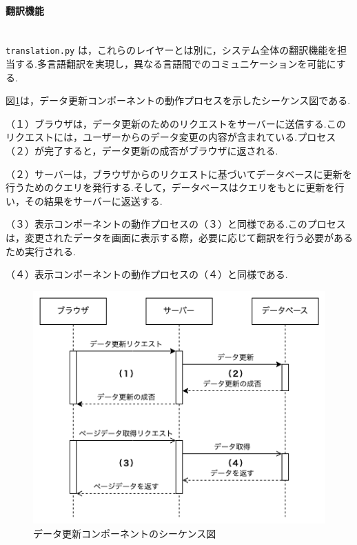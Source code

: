 \documentclass[b5paper,12pt,dvipdfmx]{jsreport}
\begin{document}
\paragraph{翻訳機能}\mbox{}\\
\texttt{translation.py} は，これらのレイヤーとは別に，システム全体の翻訳機能を担当する.多言語翻訳を実現し，異なる言語間でのコミュニケーションを可能にする.

\newpage

図\ref{data_update_component_sequence_diagram}は，データ更新コンポーネントの動作プロセスを示したシーケンス図である.

（１）ブラウザは，データ更新のためのリクエストをサーバーに送信する.このリクエストには，ユーザーからのデータ変更の内容が含まれている.プロセス（２）が完了すると，データ更新の成否がブラウザに返される.

（２）サーバーは，ブラウザからのリクエストに基づいてデータベースに更新を行うためのクエリを発行する.そして，データベースはクエリをもとに更新を行い，その結果をサーバーに返送する.

（３）表示コンポーネントの動作プロセスの（３）と同様である.このプロセスは，変更されたデータを画面に表示する際，必要に応じて翻訳を行う必要があるため実行される.

（４）表示コンポーネントの動作プロセスの（４）と同様である.


\begin{figure}[H]
    \centering
    \includegraphics[width=\textwidth]{./img/components/data_update_component_sequence_diagram.png}
    \caption{データ更新コンポーネントのシーケンス図}
    \label{data_update_component_sequence_diagram}
\end{figure}
\end{document}
